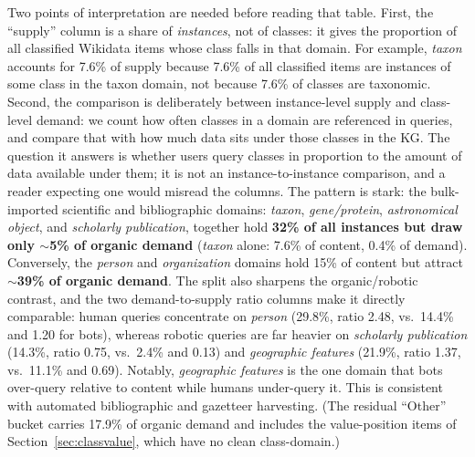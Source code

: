 \documentclass[sw]{iosart2x}
\begin{document}
Two points of interpretation are needed before reading that table. First, the ``supply'' column is a share of \emph{instances}, not of classes: it gives the proportion of all classified Wikidata items whose class falls in that domain. For example, \emph{taxon} accounts for 7.6\% of supply because 7.6\% of all classified items are instances of some class in the taxon domain, not because 7.6\% of classes are taxonomic. Second, the comparison is deliberately between instance-level supply and class-level demand: we count how often classes in a domain are referenced in queries, and compare that with how much data sits under those classes in the KG. The question it answers is whether users query classes in proportion to the amount of data available under them; it is not an instance-to-instance comparison, and a reader expecting one would misread the columns. The pattern is stark: the bulk-imported scientific and bibliographic domains: \emph{taxon}, \emph{gene/protein}, \emph{astronomical object}, and \emph{scholarly publication}, together hold \textbf{32\% of all instances but draw only $\sim$5\% of organic demand} (\emph{taxon} alone: 7.6\% of content, 0.4\% of demand). Conversely, the \emph{person} and \emph{organization} domains hold 15\% of content but attract \textbf{$\sim$39\% of organic demand}. The split also sharpens the organic/robotic contrast, and the two demand-to-supply ratio columns make it directly comparable: human queries concentrate on \emph{person} (29.8\%, ratio 2.48, vs.\ 14.4\% and 1.20 for bots), whereas robotic queries are far heavier on \emph{scholarly publication} (14.3\%, ratio 0.75, vs.\ 2.4\% and 0.13) and \emph{geographic features} (21.9\%, ratio 1.37, vs.\ 11.1\% and 0.69). Notably, \emph{geographic features} is the one domain that bots over-query relative to content while humans under-query it. This is consistent with automated bibliographic and gazetteer harvesting. (The residual ``Other'' bucket carries 17.9\% of organic demand and includes the value-position items of Section~\ref{sec:classvalue}, which have no clean class-domain.)
\end{document}
